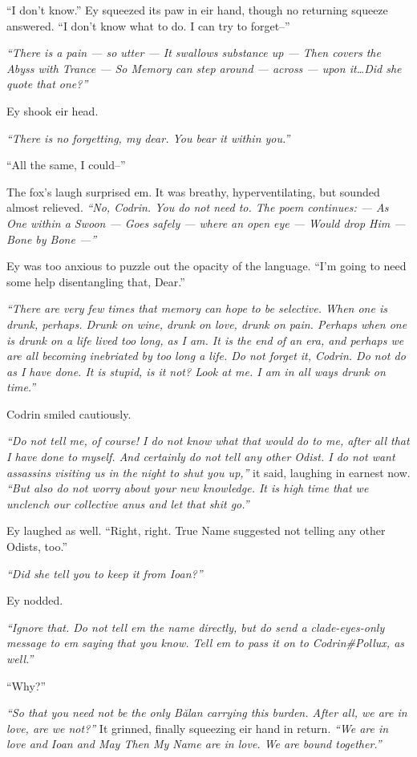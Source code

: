 ``I don't know.'' Ey squeezed its paw in eir hand, though no returning squeeze answered. ``I don't know what to do. I can try to forget--''

\emph{``There is a pain — so utter — It swallows substance up — Then covers the Abyss with Trance — So Memory can step around — across — upon it\ldots Did she quote that one?''}

Ey shook eir head.

\emph{``There is no forgetting, my dear. You bear it within you.''}

``All the same, I could--''

The fox's laugh surprised em. It was breathy, hyperventilating, but sounded almost relieved. \emph{``No, Codrin. You do not need to. The poem continues: — As One within a Swoon — Goes safely — where an open eye — Would drop Him — Bone by Bone —''}

Ey was too anxious to puzzle out the opacity of the language. ``I'm going to need some help disentangling that, Dear.''

\emph{``There are very few times that memory can hope to be selective. When one is drunk, perhaps. Drunk on wine, drunk on love, drunk on pain. Perhaps when one is drunk on a life lived too long, as I am. It is the end of an era, and perhaps we are all becoming inebriated by too long a life. Do not forget it, Codrin. Do not do as I have done. It is stupid, is it not? Look at me. I am in all ways drunk on time.''}

Codrin smiled cautiously.

\emph{``Do not tell me, of course! I do not know what that would do to me, after all that I have done to myself. And certainly do not tell any other Odist. I do not want assassins visiting us in the night to shut you up,''} it said, laughing in earnest now. \emph{``But also do not worry about your new knowledge. It is high time that we unclench our collective anus and let that shit go.''}

Ey laughed as well. ``Right, right. True Name suggested not telling any other Odists, too.''

\emph{``Did she tell you to keep it from Ioan?''}

Ey nodded.

\emph{``Ignore that. Do not tell em the name directly, but do send a clade-eyes-only message to em saying that you know. Tell em to pass it on to Codrin\#Pollux, as well.''}

``Why?''

\emph{``So that you need not be the only Bălan carrying this burden. After all, we are in love, are we not?''} It grinned, finally squeezing eir hand in return. \emph{``We are in love and Ioan and May Then My Name are in love. We are bound together.''}

